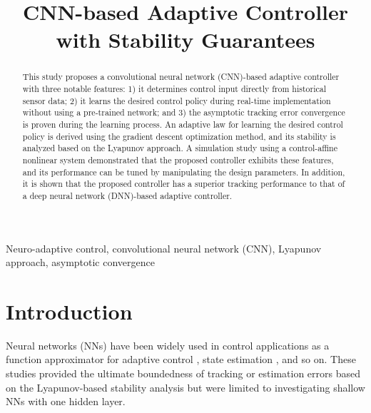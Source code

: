 \documentclass{l4dc2025}
\title[
    CNN-based Adaptive Controller with Stability Guarantees
]{
    CNN-based Adaptive Controller with Stability Guarantees
}
\begin{document}
\maketitle

\begin{abstract}%
  This study proposes a convolutional neural network (CNN)-based adaptive controller with three notable features: 1) it determines control input directly from historical sensor data; 2) it learns the desired control policy during real-time implementation without using a pre-trained network; and 3) the asymptotic tracking error convergence is proven during the learning process. An adaptive law for learning the desired control policy is derived using the gradient descent optimization method, and its stability is analyzed based on the Lyapunov approach. A simulation study using a control-affine nonlinear system demonstrated that the proposed controller exhibits these features, and its performance can be tuned by manipulating the design parameters. In addition, it is shown that the proposed controller has a superior tracking performance to that of a deep neural network (DNN)-based adaptive controller.
\end{abstract}

\begin{keywords}%
    Neuro-adaptive control, convolutional neural network (CNN), Lyapunov approach, asymptotic convergence%
\end{keywords}

\section{Introduction}

Neural networks (NNs) have been widely used in control applications as a function approximator for adaptive control \cite{BookEKcontrol}, state estimation \cite{BoockEKestimation}, and so on. 
These studies provided the ultimate boundedness of tracking or estimation errors based on the Lyapunov-based stability analysis but were limited to investigating shallow NNs with one hidden layer.
\end{document}
